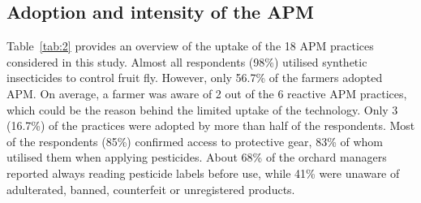 \documentclass[fleqn,twoside,reqno]{article}
\begin{document}
\subsection{Adoption and intensity of the APM}
Table~\ref{tab:2} provides an overview of the uptake of the 18 APM practices considered in this study. Almost all respondents (98\%) utilised synthetic insecticides to control fruit fly. However, only 56.7\% of the farmers adopted APM. On average, a farmer was aware of 2 out of the 6 reactive APM practices, which could be the reason behind the limited uptake of the technology. Only 3 (16.7\%) of the practices were adopted by more than half of the respondents. Most of the respondents (85\%) confirmed access to protective gear, 83\% of whom utilised them when applying pesticides. About 68\% of the orchard managers reported always reading pesticide labels before use, while 41\% were unaware of adulterated, banned, counterfeit or unregistered products.
\end{document}
